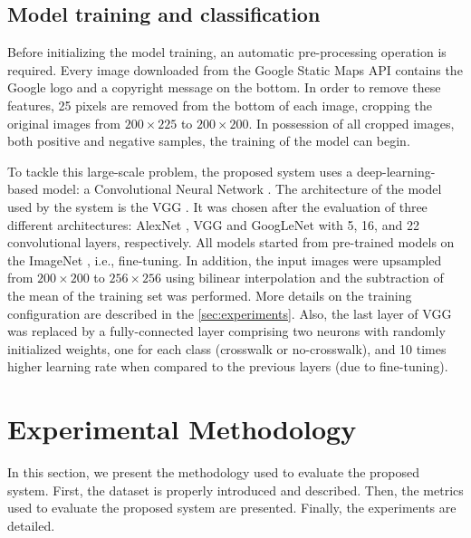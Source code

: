 \documentclass[journal]{IEEEtran}
\newcommand{\GoogleStaticMapsAPI}{Google Static Maps API\xspace}
\begin{document}
\subsection{Model training and classification}

Before initializing the model training, an automatic pre-processing operation is required. Every image downloaded from the \GoogleStaticMapsAPI contains the Google logo and a copyright message on the bottom. In order to remove these features, 25 pixels are removed from the bottom of each image, cropping the original images from $200\times225$ to $200\times200$. In possession of all cropped images, both positive and negative samples, the training of the model can begin.

To tackle this large-scale problem, the proposed system uses a deep-learning-based model: a Convolutional Neural Network \cite{le1990handwritten}.
The architecture of the model used by the system is the VGG \cite{simonyan2014very}. It was chosen after the evaluation of three different architectures: AlexNet \cite{krizhevsky2012imagenet}, VGG and GoogLeNet \cite{szegedy2015going} with 5, 16, and 22 convolutional layers, respectively. All models started from pre-trained models on the ImageNet \cite{ILSVRC15}, i.e., fine-tuning. In addition, the input images were upsampled from $200\times200$ to $256\times256$ using bilinear interpolation and the subtraction of the mean of the training set was performed. More details on the training configuration are described in the \autoref{sec:experiments}. Also, the last layer of VGG was replaced by a fully-connected layer comprising two neurons with randomly initialized weights, one for each class (crosswalk or no-crosswalk), and 10 times higher learning rate when compared to the previous layers (due to fine-tuning).

\section{Experimental Methodology}
\label{sec:experiments}

In this section, we present the methodology used to evaluate the proposed system. First, the dataset is properly introduced and described. Then, the metrics used to evaluate the proposed system are presented. Finally, the experiments are detailed.
\end{document}
